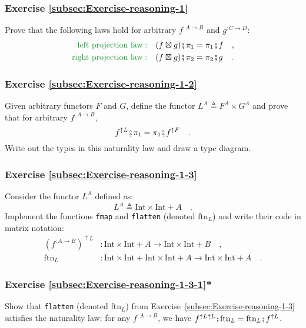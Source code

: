 \subsubsection{Exercise \label{subsec:Exercise-reasoning-1}\ref{subsec:Exercise-reasoning-1}}

Prove that the following laws hold for arbitrary $f^{:A\rightarrow B}$
and $g^{:C\rightarrow D}$:
\begin{align*}
{\color{greenunder}\text{left projection law}:}\quad & (f\boxtimes g)\bef\pi_{1}=\pi_{1}\bef f\quad,\\
{\color{greenunder}\text{right projection law}:}\quad & (f\boxtimes g)\bef\pi_{2}=\pi_{2}\bef g\quad.
\end{align*}


\subsubsection{Exercise \label{subsec:Exercise-reasoning-1-2}\ref{subsec:Exercise-reasoning-1-2}}

Given arbitrary functors $F$ and $G$, define the functor $L^{A}\triangleq F^{A}\times G^{A}$
and prove that for arbitrary $f^{:A\rightarrow B}$,
\[
f^{\uparrow L}\bef\pi_{1}=\pi_{1}\bef f^{\uparrow F}\quad.
\]
Write out the types in this naturality law and draw a type diagram. 

\subsubsection{Exercise \label{subsec:Exercise-reasoning-1-3}\ref{subsec:Exercise-reasoning-1-3}}

Consider the functor $L^{A}$ defined as:
\[
L^{A}\triangleq\text{Int}\times\text{Int}+A\quad.
\]
Implement the functions \lstinline!fmap! and \lstinline!flatten!
(denoted $\text{ftn}_{L}$) and write their code in matrix notation:
\begin{align*}
(f^{:A\rightarrow B})^{\uparrow L} & :\text{Int}\times\text{Int}+A\rightarrow\text{Int}\times\text{Int}+B\quad,\\
\text{ftn}_{L} & :\text{Int}\times\text{Int}+\text{Int}\times\text{Int}+A\rightarrow\text{Int}\times\text{Int}+A\quad.
\end{align*}


\subsubsection{Exercise \label{subsec:Exercise-reasoning-1-3-1}\ref{subsec:Exercise-reasoning-1-3-1}{*}}

Show that \lstinline!flatten! (denoted $\text{ftn}_{L}$) from Exercise~\ref{subsec:Exercise-reasoning-1-3}
satisfies the naturality law: for any $f^{:A\rightarrow B}$, we have
$f^{\uparrow L\uparrow L}\bef\text{ftn}_{L}=\text{ftn}_{L}\bef f^{\uparrow L}$.
